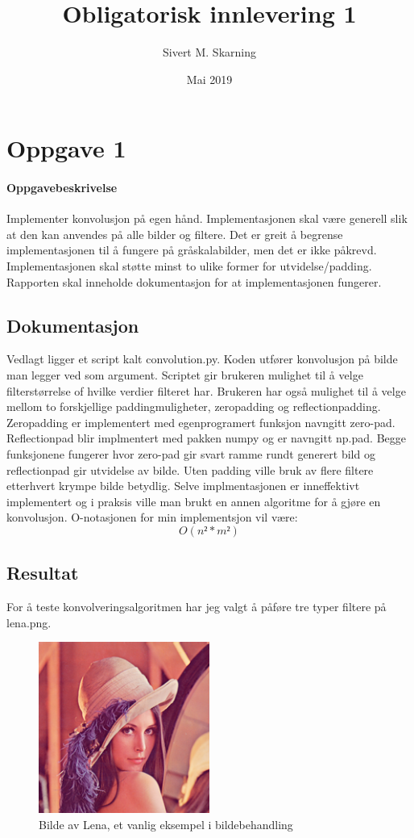 \documentclass[a4paper, 12pt]{article}
\title{Obligatorisk innlevering 1}
\author{Sivert M. Skarning}
\date{Mai 2019}
\begin{document}
\maketitle
\section{Oppgave 1}
\paragraph{Oppgavebeskrivelse}
Implementer konvolusjon på egen hånd. Implementasjonen skal være generell slik at den kan anvendes på alle bilder og filtere. Det er greit å begrense implementasjonen til å fungere på gråskalabilder, men det er ikke påkrevd. Implementasjonen skal støtte minst to ulike former for utvidelse/padding. Rapporten skal inneholde dokumentasjon for at implementasjonen fungerer.
\subsection{Dokumentasjon}
Vedlagt ligger et script kalt convolution.py. Koden utfører konvolusjon på bilde man legger ved som argument. Scriptet gir brukeren mulighet til å velge filterstørrelse of hvilke verdier filteret har. Brukeren har også mulighet til å velge mellom to forskjellige paddingmuligheter, zeropadding og reflectionpadding. Zeropadding er implementert med egenprogramert funksjon navngitt zero-pad.
Reflectionpad blir implmentert med pakken numpy og er navngitt np.pad. Begge funksjonene fungerer hvor zero-pad gir svart ramme rundt generert bild og reflectionpad gir utvidelse av bilde. Uten padding ville bruk av flere filtere etterhvert krympe bilde betydlig.
Selve implmentasjonen er inneffektivt implementert og i praksis ville man brukt en annen algoritme for å gjøre en konvolusjon. O-notasjonen for min implementsjon vil være: $$O(n² * m²)$$



\subsection{Resultat}
For å teste konvolveringsalgoritmen har jeg valgt å påføre tre typer filtere på lena.png.

\begin{figure}[h]
  \centering
  \includegraphics[width=0.5\textwidth]{images/lena}
  \caption{Bilde av Lena, et vanlig eksempel i bildebehandling}
  \label{fig:lena}
\end{figure}
\end{document}
